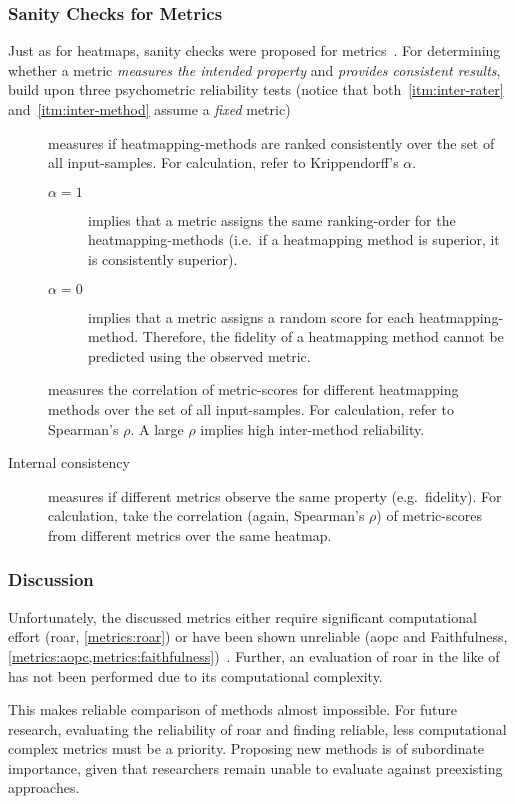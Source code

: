 \subsubsection{Sanity Checks for Metrics}\label{metrics:sanity-checks}
Just as for heatmaps, sanity checks were proposed for metrics~.\cite{Tomsett.2019} For determining whether a metric \textit{measures the intended property} and \textit{provides consistent results}, \citeauthor{Tomsett.2019} build upon three psychometric reliability tests (notice that both~\ref{itm:inter-rater} and~\ref{itm:inter-method} assume a \textit{fixed} metric)
\begin{description}
    \item[] measures if heatmapping-methods are ranked consistently over the set of all input-samples.
    For calculation, \citeauthor{Tomsett.2019} refer to Krippendorff's \(\alpha\).
    \begin{description}
        \item[\(\alpha = 1\)] implies that a metric assigns the same ranking-order for the heatmapping-methods (i.e.\ if a heatmapping method is superior, it is consistently superior). 
        \item[\(\alpha = 0\)] implies that a metric assigns a random score for each heatmapping-method. Therefore, the fidelity of a heatmapping method cannot be predicted using the observed metric.
    \end{description} 
    \item[] measures the correlation of metric-scores for different heatmapping methods over the set of all input-samples. For calculation, \citeauthor{Tomsett.2019} refer to Spearman's \(\rho\). A large \(\rho\) implies high inter-method reliability.
    \item[Internal consistency] measures if different metrics observe the same property (e.g.\ fidelity). For calculation, \citeauthor{Tomsett.2019} take the correlation (again, Spearman's \(\rho\)) of metric-scores from different metrics over the same heatmap.
\end{description}

\subsubsection{Discussion}\label{metrics:discussion}
Unfortunately, the discussed metrics either require significant computational effort (\gls{roar}, \cref{metrics:roar}) or have been shown unreliable (\gls{aopc} and Faithfulness, \cref{metrics:aopc,metrics:faithfulness})~\cite{Hooker.2019,Tomsett.2019}. Further, an evaluation of \gls{roar} in the like of  has not been performed due to its computational complexity.
\par
This makes reliable comparison of methods almost impossible. For future research, evaluating the reliability of \gls{roar} and finding reliable, less computational complex metrics must be a priority. Proposing new methods is of subordinate importance, given that researchers remain unable to evaluate against preexisting approaches.